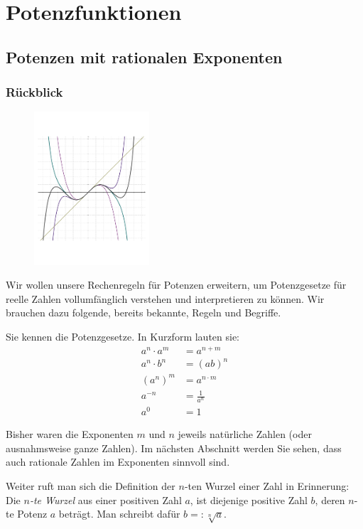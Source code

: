 \documentclass[%
11pt,%
twoside,%
titlepage,%
german,%
headsepline%
]{scrartcl}
\begin{document}
\clearpage
 
\section{Potenzfunktionen}
  
\subsection{Potenzen mit rationalen Exponenten}
\subsubsection{Rückblick}
  \begin{figure}
  \begin{center}
    \includegraphics[width=0.382\textwidth]{pictures/title}
  \end{center}
\end{figure}
Wir wollen unsere Rechenregeln für Potenzen erweitern, um Potenzgesetze
für reelle Zahlen vollumfänglich verstehen und interpretieren zu können.
Wir brauchen dazu folgende, bereits bekannte, Regeln und Begriffe.
\begin{erin}
  Sie
  kennen die Potenzgesetze. In Kurzform lauten sie:
\begin{align}
  a^n\cdot a^m&=a^{n+m}\\
  a^n\cdot b^n&=(ab)^n\\
  \left(a^n\right)^m&=a^{n\cdot m}\\
  a^{-n}&=\frac{1}{a^n}\\
  a^0&=1
\end{align}

Bisher waren die Exponenten $m$ und $n$ jeweils natürliche Zahlen (oder ausnahmsweise ganze Zahlen). Im
nächsten Abschnitt werden Sie sehen, dass auch rationale Zahlen im Exponenten sinnvoll sind.

Weiter ruft man sich die Definition der $n$-ten Wurzel einer Zahl
in Erinnerung: Die \emph{$n$-te Wurzel} aus einer positiven Zahl
$a$, ist diejenige positive Zahl $b$, deren $n$-te Potenz $a$ beträgt.
Man schreibt dafür $b=:\sqrt[n]{a}$.
\end{erin}
\end{document}
